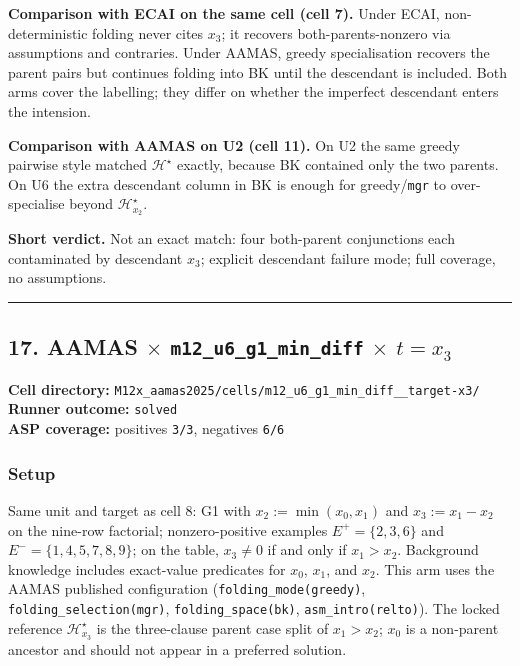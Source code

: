 \documentclass[11pt]{article}
\begin{document}
\textbf{Comparison with ECAI on the same cell (cell 7).} Under ECAI, non-deterministic folding never cites \(x_3\); it recovers both-parents-nonzero via assumptions and contraries. Under AAMAS, greedy specialisation recovers the parent pairs but continues folding into BK until the descendant is included. Both arms cover the labelling; they differ on whether the imperfect descendant enters the intension.

\textbf{Comparison with AAMAS on U2 (cell 11).} On U2 the same greedy pairwise style matched \(\mathcal{H}^\star\) exactly, because BK contained only the two parents. On U6 the extra descendant column in BK is enough for greedy/\texttt{mgr} to over-specialise beyond \(\mathcal{H}_{x_2}^\star\).

\textbf{Short verdict.} Not an exact match: four both-parent conjunctions each contaminated by descendant \(x_3\); explicit descendant failure mode; full coverage, no assumptions.

\medskip\hrule\medskip

\subsection{\texorpdfstring{17. AAMAS \(\times\) \texttt{m12\_u6\_g1\_min\_diff} \(\times\) \(t=x_3\)}{17. AAMAS - m12-u6-g1-min-diff - target x3}}

\textbf{Cell directory:} \texttt{M12x\_aamas2025/cells/m12\_u6\_g1\_min\_diff\_\_target-x3/}\\
\textbf{Runner outcome:} \texttt{solved}\\
\textbf{ASP coverage:} positives \texttt{3/3}, negatives \texttt{6/6}

\subsubsection{Setup}

Same unit and target as cell 8: G1 with \(x_2:=\min(x_0,x_1)\) and \(x_3:=x_1-x_2\) on the nine-row factorial; nonzero-positive examples \(E^+=\{2,3,6\}\) and \(E^-=\{1,4,5,7,8,9\}\); on the table, \(x_3\neq 0\) if and only if \(x_1>x_2\). Background knowledge includes exact-value predicates for \(x_0\), \(x_1\), and \(x_2\). This arm uses the AAMAS published configuration (\texttt{folding\_mode(greedy)}, \texttt{folding\_selection(mgr)}, \texttt{folding\_space(bk)}, \texttt{asm\_intro(relto)}). The locked reference \(\mathcal{H}_{x_3}^\star\) is the three-clause parent case split of \(x_1>x_2\); \(x_0\) is a non-parent ancestor and should not appear in a preferred solution.
\end{document}
